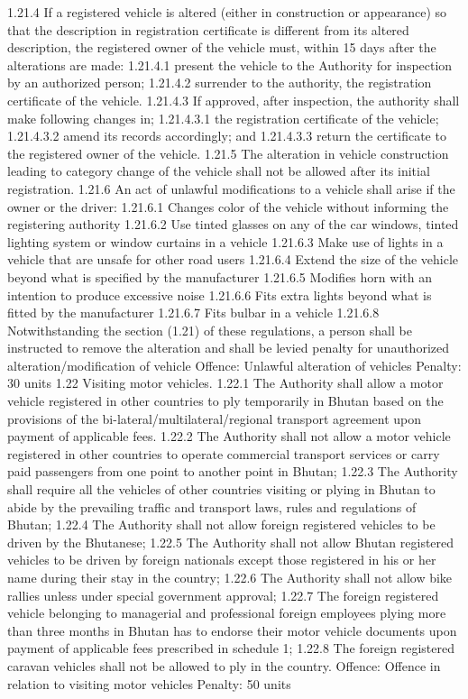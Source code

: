\documentclass[
]{book}
\begin{document}
1.21.4 If a registered vehicle is altered (either in construction or appearance) so that the description in registration certificate is different from its altered description, the registered owner of the vehicle must, within 15 days after the alterations are made:
1.21.4.1 present the vehicle to the Authority for inspection by an authorized person;
1.21.4.2 surrender to the authority, the registration certificate of the vehicle.
1.21.4.3 If approved, after inspection, the authority shall make following changes in;
1.21.4.3.1 the registration certificate of the vehicle;
1.21.4.3.2 amend its records accordingly; and
1.21.4.3.3 return the certificate to the registered owner of the vehicle.
1.21.5 The alteration in vehicle construction leading to category change of the vehicle shall not be allowed after its initial registration.
1.21.6 An act of unlawful modifications to a vehicle shall arise if the owner or the driver:
1.21.6.1 Changes color of the vehicle without informing the registering authority
1.21.6.2 Use tinted glasses on any of the car windows, tinted lighting system or window curtains in a vehicle
1.21.6.3 Make use of lights in a vehicle that are unsafe for other road users
1.21.6.4 Extend the size of the vehicle beyond what is specified by the manufacturer
1.21.6.5 Modifies horn with an intention to produce excessive noise
1.21.6.6 Fits extra lights beyond what is fitted by the manufacturer
1.21.6.7 Fits bulbar in a vehicle
1.21.6.8 Notwithstanding the section (1.21) of these regulations, a person shall be instructed to remove the alteration and shall be levied penalty for unauthorized alteration/modification of vehicle
Offence: Unlawful alteration of vehicles
Penalty: 30 units
1.22 Visiting motor vehicles.
1.22.1 The Authority shall allow a motor vehicle registered in other countries to ply temporarily in Bhutan based on the provisions of the bi-lateral/multilateral/regional transport agreement upon payment of applicable fees.
1.22.2 The Authority shall not allow a motor vehicle registered in other countries to operate commercial transport services or carry paid passengers from one point to another point in Bhutan;
1.22.3 The Authority shall require all the vehicles of other countries visiting or plying in Bhutan to abide by the prevailing traffic and transport laws, rules and regulations of Bhutan;
1.22.4 The Authority shall not allow foreign registered vehicles to be driven by the Bhutanese;
1.22.5 The Authority shall not allow Bhutan registered vehicles to be driven by foreign nationals except those registered in his or her name during their stay in the country;
1.22.6 The Authority shall not allow bike rallies unless under special government approval;
1.22.7 The foreign registered vehicle belonging to managerial and professional foreign employees plying more than three months in Bhutan has to endorse their motor vehicle documents upon payment of applicable fees prescribed in schedule 1;
1.22.8 The foreign registered caravan vehicles shall not be allowed to ply in the country.
Offence: Offence in relation to visiting motor vehicles
Penalty: 50 units
\end{document}
